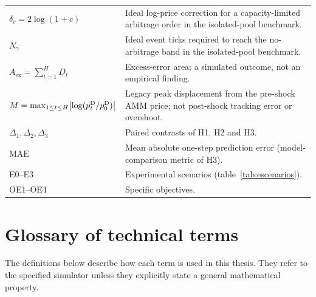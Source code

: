 \begin{center}
\begin{tabularx}{\textwidth}{@{}l X@{}}
$\delta_c=2\log(1+c)$ & Ideal log-price correction for a capacity-limited arbitrage order in the isolated-pool benchmark. \\
$N_\gamma$ & Ideal event ticks required to reach the no-arbitrage band in the isolated-pool benchmark. \\
$A_{\mathrm{ex}} = \sum_{t=1}^{H} D_t$ & Excess-error area; a simulated outcome, not an empirical finding. \\
$M = \max_{1\le t\le H}\bigl|\log(p^{\mathrm{D}}_t/p^{\mathrm{D}}_0)\bigr|$ & Legacy peak displacement from the pre-shock AMM price; not post-shock tracking error or overshoot. \\
$\Delta_1,\Delta_2,\Delta_3$ & Paired contrasts of H1, H2 and H3. \\
$\mathrm{MAE}$ & Mean absolute one-step prediction error (model-comparison metric of H3). \\
E0--E3 & Experimental scenarios (table~\ref{tab:escenarios}). \\
OE1--OE4 & Specific objectives. \\
\bottomrule
\end{tabularx}
\end{center}

\section*{Glossary of technical terms}
{}

\begingroup
\small
\setlength{\parskip}{0.15em}
The definitions below describe how each term is used in this thesis. They refer to
the specified simulator unless they explicitly state a general mathematical property.


